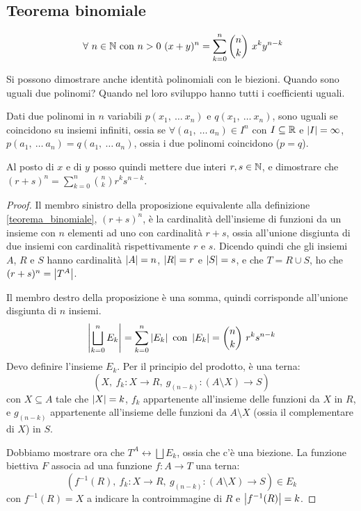 \subsection{Teorema binomiale}
\begin{prop}
\[
\forall n \in \naturals \text{ con } n > 0 \ 
(x + y)^n = 
\sum_{k = 0}^n \binom{n}{k} \ x^k y^{n - k}
\]
\end{prop}
Si possono dimostrare anche identit\`a polinomiali con le biezioni. Quando sono uguali due polinomi? Quando nel loro sviluppo hanno tutti i coefficienti uguali.
\begin{theorem}
Dati due polinomi in $n$ variabili $p(x_1, \ \dots \ x_n)$ e $q(x_1, \ \dots \ x_n)$, sono uguali se coincidono su insiemi infiniti, ossia se $\forall (a_1, \ \dots \ a_n) \in I^n$ con $I \subseteq \mathbb{R} $ e $ \left\lvert{I}\right\rvert = \infty$, $p(a_1, \ \dots \ a_n) = q(a_1, \ \dots \ a_n)$, ossia i due polinomi coincidono ($p = q$).
\end{theorem}
Al posto di $x$ e di $y$ posso quindi mettere due interi $r, s \in \mathbb{N}$, e dimostrare che $(r + s)^n = \sum_{k = 0}^n \binom{n}{k} r^k s^{n - k}$.
\begin{proof}
Il membro sinistro della proposizione equivalente alla definizione \ref{teorema_binomiale}, $(r + s)^n$, \`e la cardinalit\`a dell'insieme di funzioni da un insieme con $n$ elementi ad uno con cardinalit\`a $r + s$, ossia all'unione disgiunta di due insiemi con cardinalit\`a rispettivamente $r$ e $s$. Dicendo quindi che gli insiemi $A$, $R$ e $S$ hanno cardinalit\`a $\left\lvert{A}\right\rvert = n$, $\left\lvert{R}\right\rvert = r $ e $\left\lvert{S}\right\rvert = s$, e che $T = R \cup S$, ho che $(r + s)^n = \left\lvert{T^A}\right\rvert$.

Il membro destro della proposizione \`e una somma, quindi corrisponde all'unione disgiunta di $n$ insiemi.
\[
\left\lvert{\bigsqcup_{k = 0}^{n} E_k}\right\rvert = \sum_{k = 0}^{n} \left\lvert{E_k}\right\rvert
\text{ con }
\left\lvert{E_k}\right\rvert = \binom{n}{k} \ r^k s^{n - k}
\]
Devo definire l'insieme $E_k$. Per il principio del prodotto, \`e una terna:
\[
\left( X, \ f_k : X \to R, \ g_{(n - k)} : (A \setminus X) \to S \right)
\]
con $X \subseteq A$ tale che $\left\lvert{X}\right\rvert = k$, $f_k$ appartenente all'insieme delle funzioni da $X$ in $R$, e $g_{(n-k)}$ appartenente all'insieme delle funzioni da $A \setminus X$ (ossia il complementare di $X$) in $S$.

Dobbiamo mostrare ora che $T^A \leftrightarrow \bigsqcup E_k$, ossia che c'\`e una biezione. La funzione biettiva $F$ associa ad una funzione $f : A \to T$ una terna:
\[
\left( f^{-1} (R), \ f_k : X \to R, \ g_{(n - k)} : (A \setminus X) \to S \right) \in E_k
\]
con $f^{-1}(R) = X$ a indicare la controimmagine di $R$ e $\left\lvert{f^{-1}(R)}\right\rvert = k$.
\end{proof}

